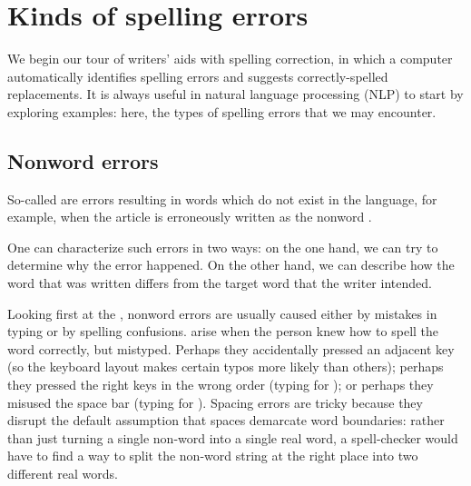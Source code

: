 \section{Kinds of spelling errors}

 We begin our tour of writers' aids with spelling correction, in which a computer automatically identifies spelling errors and suggests correctly-spelled replacements.  It is always useful in natural language processing (NLP) to start by exploring examples: here, the types of spelling errors that we may encounter.  %

\subsection{Nonword errors}
\label{nonword:errors}
So-called  are errors resulting in
words which do not exist in the language, for example, when the
article  is erroneously written as the nonword
. 

One can characterize such errors in two ways: on the one hand, we can
try to determine why the error happened. On the other hand, we can describe how the word that was written
differs from the target word that the writer
intended.

Looking first at the , nonword errors are usually
caused either by mistakes in typing or by spelling confusions.
 arise when the person knew how to spell the word correctly,
but mistyped.  Perhaps they accidentally pressed an adjacent key (so the keyboard layout makes certain typos more likely than others); perhaps they pressed the right keys in the wrong order (typing  for ); or perhaps they misused the space bar (typing  for ).  Spacing errors are tricky because they disrupt the default assumption that spaces demarcate word boundaries: rather than just turning a single non-word into a single real word, a spell-checker would have to find a way to split the non-word string at the right place into two different real words.


